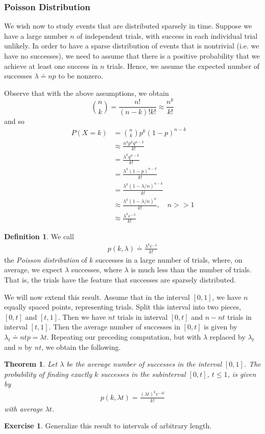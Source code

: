 \documentclass[12pt]{article}
\theoremstyle{plain}
\newtheorem{theorem}{Theorem}
\theoremstyle{definition}
\newtheorem*{definition}{Definition}
\newtheorem*{exercise}{Exercise}
\theoremstyle{remark}
\numberwithin{equation}{section}  %
\begin{document}
\subsubsection{Poisson Distribution}
We wish now to study events that are distributed sparsely in time.
Suppose we have a large number $n$ of independent trials, with
success in each individual trial unlikely. In order to have a sparse
distribution of events that is nontrivial (i.e. we have no successes),
we need to assume that there is a positive
probability that we achieve at least one success in $n$ trials. Hence, we assume the expected number of
successes $\lambda \doteq np$ to be nonzero.

Observe that with the above assumptions, we obtain
\begin{equation*}
\binom{n}{k} = \frac{n!}{(n-k)! k!} \approx \frac{n^k}{k!}
\end{equation*}
and so
\begin{align*}
P(X = k)
& = \binom{n}{k} p^k (1 - p)^{n-k} \\
& \approx \frac{n^k p^k q^{n-k}}{k!} \\
& = \frac{\lambda^k q^{n-k}}{k!} \\
& = \frac{\lambda^k (1-p)^{n-k}}{k!} \\
& = \frac{\lambda^k (1-\lambda/n)^{n-k}}{k!} \\
& \approx \frac{\lambda^k (1-\lambda/n)^{n}}{k!} , \quad n >> 1\\
& \approx \frac{\lambda^k e^{-\lambda}}{k!}
\end{align*}
\begin{definition}
We call
\begin{align*}
p(k, \lambda) \doteq \frac{\lambda^k e^{-\lambda}}{k!}
\end{align*}
the \emph{Poisson distribution} of $k$ successes in a large number
of trials, where, on average, we expect $\lambda$ successes,
where $\lambda$ is much less than the number of trials.
That is, the trials have the feature that successes are
sparsely distributed.
\end{definition}
We will now extend this result. Assume that in the interval $[0,1]$,
we have $n$ equally spaced points, representing trials. Split this interval into two pieces,
$[0,t]$ and $[t, 1]$. Then we have $nt$ trials in interval $[0,t]$ and
$n - nt$ trials in interval $[t,1]$. Then the average number of successes
in $[0,t]$ is given by $\lambda_t \doteq n t p = \lambda t$. Repeating
our preceding computation, but with $\lambda$ replaced by $\lambda_t$
and $n$ by $nt$, we obtain the following.
\begin{theorem}
Let $\lambda$ be the average number of successes in the interval $[0,1]$.
The probability of finding exactly $k$ successes  in the subinterval $[0,t]$,
$t \le 1$, is given by
\begin{align*}
p(k, \lambda t) = \frac{ (\lambda t)^{k} e^{-\lambda t}}{k!}
\end{align*}
with average $\lambda t$.
\end{theorem}
\begin{exercise}
Generalize this result to intervals of arbitrary length.
\end{exercise}
\end{document}
